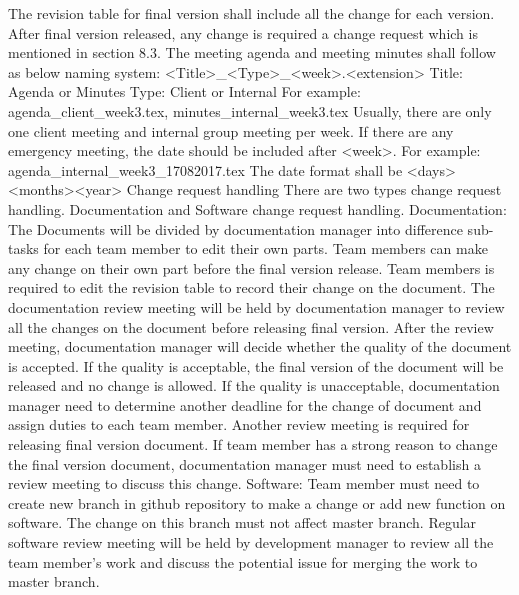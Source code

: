 The revision table for final version shall include all the change for each version. After final version released, any change is required a change request which is mentioned in section 8.3.
The meeting agenda and meeting minutes shall follow as below naming system:
<Title>_<Type>_<week>.<extension>
Title: Agenda or Minutes
Type: Client or Internal
For example: agenda_client_week3.tex, minutes_internal_week3.tex
Usually, there are only one client meeting and internal group meeting per week. If there are any emergency meeting, the date should be included after <week>.
For example: agenda_internal_week3_17082017.tex
The date format shall be <days><months><year>
Change request handling
There are two types change request handling. Documentation and Software change request handling.
Documentation:
The Documents will be divided by documentation manager into difference sub-tasks for each team member to edit their own parts. Team members can make any change on their own part before the final version release. Team members is required to edit the revision table to record their change on the document. The documentation review meeting will be held by documentation manager to review all the changes on the document before releasing final version. After the review meeting, documentation manager will decide whether the quality of the document is accepted. If the quality is acceptable, the final version of the document will be released and no change is allowed. If the quality is unacceptable, documentation manager need to determine another deadline for the change of document and assign duties to each team member. Another review meeting is required for releasing final version document.
If team member has a strong reason to change the final version document, documentation manager must need to establish a review meeting to discuss this change.
Software:
Team member must need to create new branch in github repository to make a change or add new function on software. The change on this branch must not affect master branch. Regular software review meeting will be held by development manager to review all the team member’s work and discuss the potential issue for merging the work to master branch. 



